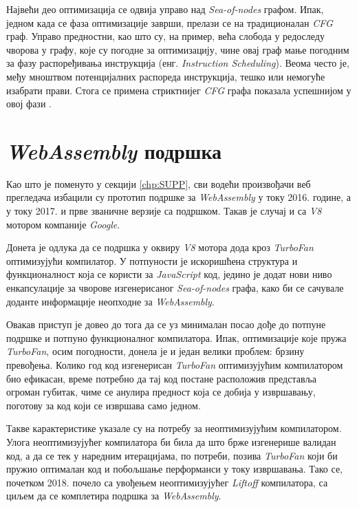 \documentclass[12pt,oneside]{memoir}
\begin{document}
Највећи део оптимизација се одвија управо над \textit{Sea-of-nodes} графом. Ипак, једном када се фаза оптимизације заврши, прелази се на традиционалан \textit{CFG} граф.
Управо предностни, као што су, на пример, већа слобода у редоследу чворова у графу, које су погодне за оптимизацију, чине овај граф мање погодним за фазу распоређивања
инструкција (енг. \textit{Instruction Scheduling}). Веома често је, међу мноштвом потенцијалних распореда инструкција, тешко или немогуће изабрати прави. Стога се примена стриктнијег \textit{CFG}
графа показала успешнијом у овој фази \cite{TFJIT}.

\section{\textit{WebAssembly} подршка} \label{chp:V8WASM}

Као што је поменуто у секцији \ref{chp:SUPP}, сви водећи произвођачи веб прегледача избацили су прототип подршке за \textit{WebAssembly} у току 2016. године, а у току 2017.
и прве званичне верзије са подршком. Такав је случај и са \textit{V8} мотором компаније \textit{Google}.

Донета је одлука да се подршка у оквиру \textit{V8} мотора дода кроз \textit{TurboFan} оптимизујући компилатор. У потпуности је искоришћена структура и функционалност која се користи
за \textit{JavaScript} код, једино је додат нови ниво енкапсулације за чворове изгенерисаног \textit{Sea-of-nodes} графа, како би се сачувале доданте информације неопходне за
\textit{WebAssembly}.

Овакав приступ је довео до тога да се уз минималан посао дође до потпуне подршке и потпуно функционалног компилатора. Ипак, оптимизације које пружа \textit{TurboFan}, осим погодности,
донела је и један велики проблем: брзину превођења. Колико год код изгенерисан \textit{TurboFan} оптимизујућим компилатором био ефикасан, време потребно да тај код
постане расположив представља огроман губитак, чиме се анулира предност која се добија у извршавању, поготову за код који се извршава само једном.

Такве карактеристике указале су на потребу за неоптимизујућим компилатором. Улога неоптимизујућег компилатора би била да што брже изгенерише валидан код,
а да се тек у наредним итерацијама, по потреби, позива \textit{TurboFan} који би пружио оптималан код и побољшање перформанси у току извршавања.
Тако се, почетком 2018. почело са увођењем неоптимизујућег \textit{Liftoff} компилатора, са циљем да се комплетира подршка за \textit{WebAssembly}.
\end{document}
